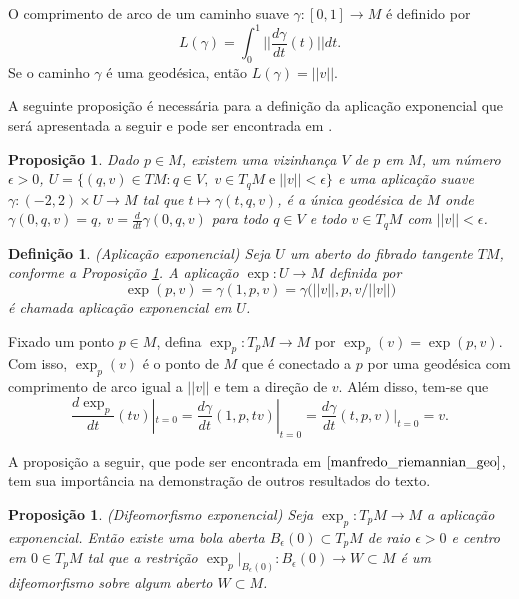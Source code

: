 \documentclass[12pt]{book}
\newtheorem{definicao}[teorema]{Definição}
\newtheorem{proposicao}[teorema]{Proposição}
\newcommand{\derivada}[2]{\frac{d #1}{d #2}}
\newcommand{\espacotangenteponto}[2]{T_{#1}#2}
\newcommand{\intervalo}{[0,1]}
\newcommand{\norma}[1]{||#1||}
\newcommand{\normagrande}[1]{\Big|\Big|#1\Big|\Big|}
\begin{document}
	O comprimento de arco de um caminho suave $\gamma:\intervalo\to M$ é definido por 
	$$
	L(\gamma) =  \int_{0}^{1}\normagrande{\derivada{\gamma}{t}(t)}dt.
	$$
	Se o caminho $\gamma$ é uma geodésica, então $L(\gamma) =\norma{v}$.
	
	A seguinte proposição é necessária para a definição da aplicação exponencial que será apresentada a seguir e pode ser encontrada em \cite{manfredo_riemannian_geo}.
	
	\begin{proposicao}\label{proposicao_existencia_geodesica}
		Dado $p\in M$, existem uma vizinhança $V$ de $p$ em $M$, um número $\epsilon>0$, $U=\{(q, v) \in TM: q\in V,\;v\in \espacotangenteponto{q}{M}\;\text{e}\;\norma{v}<\epsilon \}$ e uma aplicação suave $\gamma:(-2,2)\times U \to M$ tal que $t\mapsto \gamma(t, q, v)$, é a única geodésica de $M$ onde $\gamma(0, q, v)=q$, $v=\derivada{}{t}\gamma(0,q,v)$ para todo $q\in V$ e todo $v\in \espacotangenteponto{q}{M}$ com $\norma{v}<\epsilon$.
	\end{proposicao}
	
	\begin{definicao}\label{definicao_aplicacao_exponencial}
		(Aplicação exponencial) Seja $U$ um aberto do fibrado tangente $TM$, conforme a Proposição \ref{proposicao_existencia_geodesica}. A aplicação $\exp:U \to M$ definida por
		$$
		\exp(p,v) = \gamma(1, p,v)=\gamma\big(\norma{v}, p,v/\norma{v}\big)
		$$
		é chamada aplicação exponencial em $U$.
	\end{definicao}
	
	Fixado um ponto $p \in M$, defina $\exp_{p}:T_{p}M \to M$ por $\exp_{p}(v) = \exp(p,v)$. Com isso, $\exp_{p}(v)$ é o ponto de $M$ que é conectado a $p$ por uma geodésica com comprimento de arco igual a $\norma{v}$ e tem a direção de $v$. Além disso, tem-se que
	$$
	\derivada{\exp_{p}}{t}(tv)|_{t=0} = \derivada{\gamma}{t}(1,p,tv)|_{t=0}=\derivada{\gamma}{t}(t,p,v)|_{t=0}=v.
	$$
	
	A proposição a seguir, que pode ser encontrada em $\cite{manfredo_riemannian_geo}$, tem sua importância na demonstração de outros resultados do texto.
	
	\begin{proposicao}\label{proposicao_difeomorfismo_exponencial}
		(Difeomorfismo exponencial) Seja  $\exp_{p}:T_{p}M \to M$ a aplicação exponencial. Então existe uma bola aberta $B_{\epsilon}(0) \subset \espacotangenteponto{p}{M}$ de raio $\epsilon>0$ e centro em $0 \in T_{p}M$ tal que a restrição $\exp_{p}|_{B_{\epsilon}(0)}:B_{\epsilon}(0) \to W \subset M$ é um difeomorfismo sobre algum aberto $W \subset M$.
	\end{proposicao}
	
\end{document}
